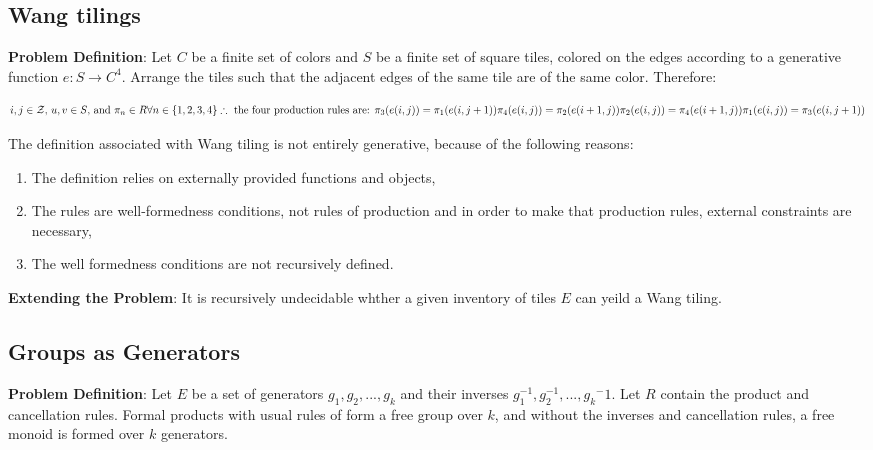 \documentclass{report}
\begin{document}
\subsection{Wang tilings}

\textbf{Problem Definition}: Let $C$ be a finite set of colors and $S$ be a
finite set of square tiles, colored on the edges according to a generative
function $e : S \rightarrow C^4 $. Arrange the tiles such that the adjacent
edges of the same tile are of the same color. Therefore:

$$
i, j \in \mathcal{Z} \text{, } u, v \in S \text{, and } \pi_n \in R \forall
n \in \{1, 2, 3, 4 \}\\

\therefore \text{ the four production rules are: } \\
\pi_3(e(i, j)) = \pi_1(e(i, j + 1)) \\
\pi_4(e(i, j)) = \pi_2(e(i + 1, j)) \\
\pi_2(e(i, j)) = \pi_4(e(i + 1, j)) \\
\pi_1(e(i, j)) = \pi_3(e(i, j + 1))
$$

 The definition associated with Wang tiling is not entirely
generative, because of the following reasons:
\begin{enumerate}
  \item The definition relies on externally provided functions and objects,
  \item The rules are well-formedness conditions, not rules of production and
        in order to make that production rules, external constraints are
        necessary,
  \item The well formedness conditions are not recursively defined.
\end{enumerate}

\textbf{Extending the Problem}: It is recursively undecidable whther a given
inventory of tiles $E$ can yeild a Wang tiling.

\subsection{Groups as Generators}

\textbf{Problem Definition}: Let $E$ be a set of generators $g_1, g_2, ..., g_k
$ and their inverses $g_1^{-1}, g_2^{-1}, ..., g_k{^-1}$. Let $R$ contain the
product and cancellation rules. Formal products with usual rules of form a free
group over $k$, and without the inverses and cancellation rules, a free monoid
is formed over $k$ generators.
\end{document}
